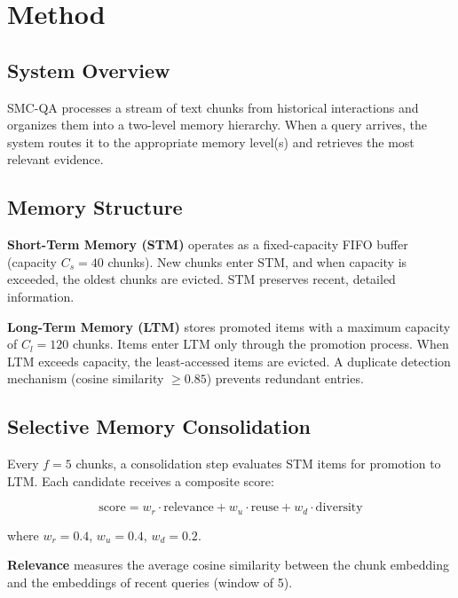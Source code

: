 \documentclass{article}
\begin{document}
\section{Method}

\subsection{System Overview}

SMC-QA processes a stream of text chunks from historical interactions and organizes them into a two-level memory hierarchy. When a query arrives, the system routes it to the appropriate memory level(s) and retrieves the most relevant evidence.

\subsection{Memory Structure}

\textbf{Short-Term Memory (STM)} operates as a fixed-capacity FIFO buffer (capacity $C_s = 40$ chunks). New chunks enter STM, and when capacity is exceeded, the oldest chunks are evicted. STM preserves recent, detailed information.

\textbf{Long-Term Memory (LTM)} stores promoted items with a maximum capacity of $C_l = 120$ chunks. Items enter LTM only through the promotion process. When LTM exceeds capacity, the least-accessed items are evicted. A duplicate detection mechanism (cosine similarity $\geq 0.85$) prevents redundant entries.

\subsection{Selective Memory Consolidation}

Every $f = 5$ chunks, a consolidation step evaluates STM items for promotion to LTM. Each candidate receives a composite score:

\begin{equation}
    \text{score} = w_r \cdot \text{relevance} + w_u \cdot \text{reuse} + w_d \cdot \text{diversity}
\end{equation}

where $w_r = 0.4$, $w_u = 0.4$, $w_d = 0.2$.

\textbf{Relevance} measures the average cosine similarity between the chunk embedding and the embeddings of recent queries (window of 5).
\end{document}
